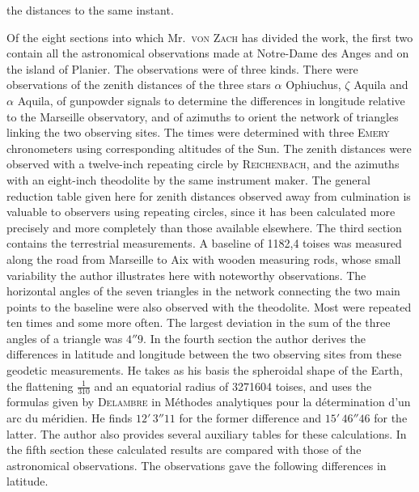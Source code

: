 the distances to the same instant.

Of the eight sections into which Mr.\ \textsc{von Zach} has divided the work, the first two contain all the astronomical observations made at Notre-Dame des Anges and on the island of Planier. The observations were of three kinds. There were observations of the zenith distances of the three stars $\alpha$ Ophiuchus, $\zeta$ Aquila and $\alpha$ Aquila, of gunpowder signals to determine the differences in longitude relative to the Marseille observatory, and of azimuths to orient the network of triangles linking the two observing sites. The times were determined with three \textsc{Emery} chronometers using corresponding altitudes of the Sun. The zenith distances were observed with a twelve-inch repeating circle by \textsc{Reichenbach}, and the azimuths with an eight-inch theodolite by the same instrument maker. The general reduction table given here for zenith distances observed away from culmination is valuable to observers using repeating circles, since it has been calculated more precisely and more completely than those available elsewhere. The third section contains the terrestrial measurements. A baseline of 1182,4 toises was measured along the road from Marseille to Aix with wooden measuring rods, whose small variability the author illustrates here with noteworthy observations. The horizontal angles of the seven triangles in the network connecting the two main points to the baseline were also observed with the theodolite. Most were repeated ten times and some more often. The largest deviation in the sum of the three angles of a triangle was $4''9$. In the fourth section the author derives the differences in latitude and longitude between the two observing sites from these geodetic measurements. He takes as his basis the spheroidal shape of the Earth, the flattening $\frac{1}{310}$ and an equatorial radius of 3271604 toises, and uses the formulas given by \textsc{Delambre} in Méthodes analytiques pour la détermination d'un arc du méridien. He finds $12'\,3''11$ for the former difference and $15'\,46''46$ for the latter. The author also provides several auxiliary tables for these calculations. In the fifth section these calculated results are compared with those of the astronomical observations. The observations gave the following differences in latitude.

